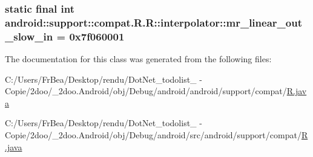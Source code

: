 \hypertarget{classandroid_1_1support_1_1compat_1_1_r_1_1interpolator_29b54098a7f1c0c9c7e2aaf99c5793c7}{
\subsubsection[{mr\_\-linear\_\-out\_\-slow\_\-in}]{\setlength{\rightskip}{0pt plus 5cm}static final int android::support::compat.R.R::interpolator::mr\_\-linear\_\-out\_\-slow\_\-in = 0x7f060001}}
\label{classandroid_1_1support_1_1compat_1_1_r_1_1interpolator_29b54098a7f1c0c9c7e2aaf99c5793c7}




The documentation for this class was generated from the following files:\begin{CompactItemize}
\item 
C:/Users/FrBea/Desktop/rendu/DotNet\_\-todolist\_ - Copie/2doo/\_\-2doo.Android/obj/Debug/android/android/support/compat/\hyperlink{android_2support_2compat_2_r_8java}{R.java}\item 
C:/Users/FrBea/Desktop/rendu/DotNet\_\-todolist\_ - Copie/2doo/\_\-2doo.Android/obj/Debug/android/src/android/support/compat/\hyperlink{src_2android_2support_2compat_2_r_8java}{R.java}\end{CompactItemize}
